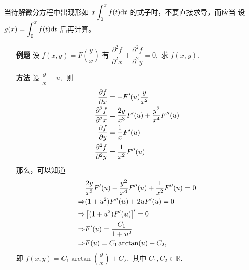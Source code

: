 当待解微分方程中出现形如 $ \displaystyle x\int_0^xf(t)\mathrm{d}t $ 的式子时，不要直接求导，而应当
设 $ \displaystyle g(x) = \int_0^xf(t)\mathrm{d}t $ 后再计算。


\begin{enumerate}
    \item[\textbf{例题}] 设 $ f(x,y) = F(\dfrac{y}{x}) $ 有 
    $ \dfrac{\partial^2 f}{\partial^2 x}+\dfrac{\partial^2 f}{\partial^2 y} = 0, $  
    求 $ f(x,y). $ 
    \item[\textbf{方法}] 设 $ \dfrac{y}{x} = u, $ 则
    \begin{equation*}
        \begin{aligned}
            \dfrac{\partial f}{\partial x} &= -F'(u)\dfrac{y}{x^2} \\ 
            \dfrac{\partial^2 f}{\partial^2 x} &= \dfrac{2y}{x^3}F'(u) + \dfrac{y^2}{x^4}F^{\prime\prime}(u)\\ 
            \dfrac{\partial f}{\partial y} &= \dfrac{1}{x}F'(u)\\
            \dfrac{\partial^2 f}{\partial^2 y} &= \dfrac{1}{x^2}F^{\prime\prime}(u)\\
        \end{aligned}
    \end{equation*}
    那么，可以知道
    \begin{equation*}
        \begin{aligned}
            &\dfrac{2y}{x^3}F'(u) + \dfrac{y^2}{x^4}F^{\prime\prime}(u)+\dfrac{1}{x^2}F^{\prime\prime}(u) = 0 \\ 
            \Rightarrow & (1+u^2)F^{\prime\prime}(u) + 2uF'(u) = 0 \\ 
            \Rightarrow & \left[(1+u^2)F'(u)\right]' = 0 \\ 
            \Rightarrow & F'(u) = \dfrac{C_1}{1+u^2} \\ 
            \Rightarrow & F(u) = C_1\arctan(u) + C_2, 
        \end{aligned}
    \end{equation*}
    即 $ f(x,y) = C_1\arctan\left(\dfrac{y}{x}\right) + C_2,$ 其中 $ C_1,C_2\in\mathbb{R}. $ 
\end{enumerate}